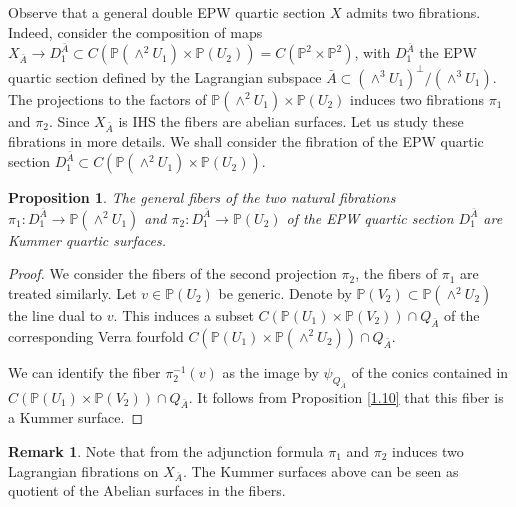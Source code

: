 \documentclass[a4paper,11pt]{amsart}
\newtheorem{prop}[thm]{Proposition}
\theoremstyle{definition}
\newtheorem{rem}[thm]{Remark}
\numberwithin{equation}{section}
\numberwithin{equation}{section} \theoremstyle{definition}
\begin{document}
Observe that a general double EPW quartic section $X$  admits two fibrations.
Indeed, consider the composition of maps $X_{\bar{A}}\to D_1^{\bar{A}} \subset C({{\mathbb{P}}}(\wedge^2 U_1)\times {{\mathbb{P}}}(U_2))=C({{\mathbb{P}}}^2\times{{\mathbb{P}}}^2)$, with $D_1^{\bar{A}}$ the EPW quartic section defined by the Lagrangian subspace ${\bar{A}}\subset (\wedge^3 U_1)^{\bot}/(\wedge^3 U_1)$.
The projections to the factors of ${{\mathbb{P}}}(\wedge^2 U_1)\times {{\mathbb{P}}}(U_2)$ induces two fibrations $\pi_1$ and $\pi_2$. Since $X_{\bar{A}}$ is IHS the fibers are abelian surfaces.
Let us study these fibrations in more details. We shall consider the fibration of the EPW quartic section $D_1^{\bar{A}} \subset C( {{\mathbb{P}}}(\wedge^2 U_1)\times {{\mathbb{P}}}(U_2))$.
\begin{prop} The general fibers of the two natural fibrations $\pi_1: D_1^{\bar{A}} \to {{\mathbb{P}}}(\wedge^2 U_1)$ and $\pi_2: D_1^{\bar{A}} \to {{\mathbb{P}}}(U_2)$ of the EPW quartic section $D_1^{\bar{A}}$ are Kummer quartic surfaces.
\end{prop}
\begin{proof} We consider the fibers of the second projection $\pi_2$, the fibers of $\pi_1$ are treated similarly. 
Let $v\in {{\mathbb{P}}}(U_2)$ be generic. 
Denote by ${{\mathbb{P}}}(V_2)\subset {{\mathbb{P}}}(\wedge^2 U_2)$ the line dual to $v$.
This induces a subset $C({{\mathbb{P}}}(U_1)\times {{\mathbb{P}}}(V_2))\cap Q_{\bar{A}}$ of the corresponding Verra fourfold  $C( {{\mathbb{P}}}(U_1)\times {{\mathbb{P}}}(\wedge^2 U_2))\cap Q_{\bar{A}}$.

We can identify the fiber $\pi_2^{-1}(v)$ as the image by $\psi_{Q_{\bar{A}}}$ 
of the conics contained in
$C({{\mathbb{P}}}(U_1)\times {{\mathbb{P}}}(V_2))\cap Q_{\bar{A}}$.
It follows from Proposition \ref{1.10} that this fiber is a Kummer surface.
\end{proof}
\begin{rem} Note that from the adjunction formula $\pi_1$ and $\pi_2$ induces two Lagrangian fibrations  
on $X_{\bar{A}}$. The Kummer surfaces above can be seen as quotient of the Abelian surfaces in the fibers. 
\end{rem}
\end{document}
